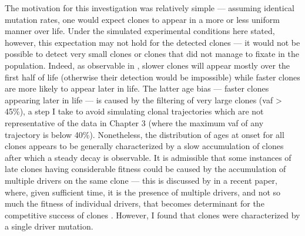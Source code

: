 The motivation for this investigation was relatively simple --- assuming identical mutation rates, one would expect clones to appear in a more or less uniform manner over life. Under the simulated experimental conditions here stated, however, this expectation may not hold for the detected clones --- it would not be possible to detect very small clones or clones that did not manage to fixate in the population. Indeed, as observable in , slower clones will appear mostly over the first half of life (otherwise their detection would be impossible) while faster clones are more likely to appear later in life. The latter age bias --- faster clones appearing later in life --- is caused by the filtering of very large clones (\ac{vaf} > 45\%), a step I take to avoid simulating clonal trajectories which are not representative of the data in Chapter 3 (where the maximum \ac{vaf} of any trajectory is below 40\%). Nonetheless, the distribution of ages at onset for all clones appears to be generally characterized by a slow accumulation of clones after which a steady decay is observable. It is admissible that some instances of late clones having considerable fitness could be caused by the accumulation of multiple drivers on the same clone --- this is discussed by  in a recent paper, where, given sufficient time, it is the presence of multiple drivers, and not so  much the fitness of individual drivers, that becomes determinant for the competitive success of clones \cite{Grossmann2020-ka}. However, I found that clones were characterized by a single driver mutation.

\begin{figure}[!ht]
	\label{fig:real-age-at-onset-distribution}
\end{figure}


